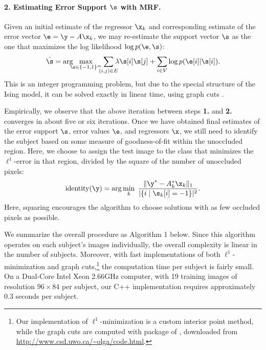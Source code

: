 \paragraph{2. Estimating Error Support $\s$ with MRF.} 
Given an initial estimate of the regressor $\x_k$ and corresponding estimate of the error vector $\e = \y - A \x_k$, we may re-estimate the support vector $\s$ as the one that maximizes the log likelihood $\log p(\e,\s)$:\vspace{0mm}
\begin{equation}
\hat{\s} = \arg\hspace{-2mm}\max_{\s \in \{-1,1\}^m}\hspace{-2mm} \sum_{(i,j)\in E} \hspace{-2mm} \lambda \s[i]\s[j] +
\sum_{i\in V} \log p(\e[i] | \s[i]). \vspace{0mm}
\end{equation}
This is an integer programming problem, but due to the special structure of the Ising model, it can be solved exactly in linear time, using graph cuts \cite{Kolmogorov2004-PAMI}.

\vspace{1 em}
Empirically, we observe that the above iteration between steps {\bf1.} and {\bf2.} converges in about five or six iterations. Once we have obtained final estimates of the error support $\s$, error values $\e$, and regressors $\x$, we still need to identify the subject based on some measure of goodness-of-fit within the unoccluded region. Here, we choose to assign the test image to the class that minimizes the $\ell^1$-error in that region, divided by the square of the number of unoccluded pixels:\vspace{0mm}
$$\text{identity}(\y) = \arg \min_k \; \frac{\| \y^* - A_k^* \x_k \|_1}{|\{ i \mid \s_k[i] = -1 \}|^2}. \vspace{0mm}$$
Here, squaring encourages the algorithm to choose solutions with as few occluded pixels as possible.

We summarize the overall procedure as Algorithm 1 below. Since this algorithm operates on each subject's images individually, the overall complexity is linear in the number of subjects. Moreover, with fast implementations of both $\ell^1$-minimization and graph cuts,\footnote{Our implementation of $\ell^1$-minimization is a custom interior point method, while the graph cuts are computed with package of \cite{Boykov2001-PAMI,Kolmogorov2004-PAMI,Boykov2004-PAMI}, downloaded from \url{http://www.csd.uwo.ca/~olga/code.html}.} the computation time per subject is fairly small. On a Dual-Core Intel Xeon 2.66GHz computer, with 19 training images of resolution $96 \times 84$ per subject, our C++ implementation requires approximately 0.3 seconds per subject.

